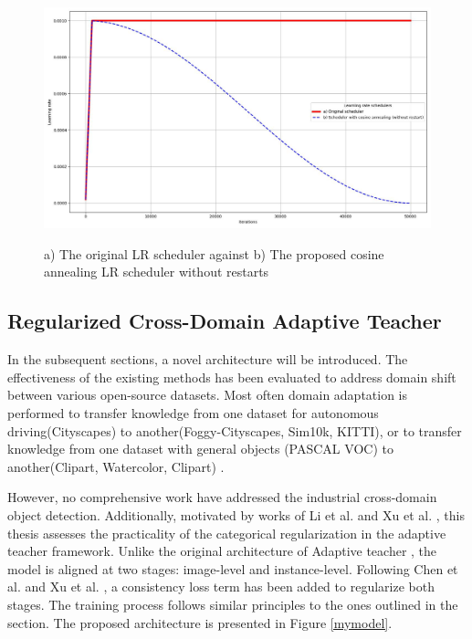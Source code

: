 \documentclass[english, 12pt, a4paper, elec, utf8, a-1b, online]{aaltothesis}
\begin{document}
\begin{figure}[htb]
	\begin{center}
		\includegraphics[width=14cm]{./LR.jpg}
	\end{center}
	\caption{a) The original LR scheduler against b) The proposed cosine annealing LR scheduler without restarts}
	\begin{center}
		\label{annealing}
	\end{center}
\end{figure}
\FloatBarrier

\subsection{Regularized Cross-Domain Adaptive Teacher}
\label{mainExperiments} 
In the subsequent sections, a novel architecture will be introduced. The effectiveness of the existing methods has been evaluated to address domain shift  between various open-source datasets. Most often domain adaptation is performed to transfer knowledge from one dataset for autonomous driving(Cityscapes) to another(Foggy-Cityscapes, Sim10k, KITTI), or to transfer knowledge from one dataset with general objects (PASCAL VOC) to another(Clipart, Watercolor, Clipart) \cite{Oza2021}.  

However, no comprehensive work have addressed the industrial cross-domain object detection. Additionally, motivated by works of Li et al. \cite{Li2021} and Xu et al. \cite{Xu2020}, this thesis assesses the practicality of the categorical regularization in the adaptive teacher framework. Unlike the original architecture of Adaptive teacher \cite{Li2021}, the model is aligned at two stages:  image-level and instance-level. Following Chen et al. \cite{Chen2018} and Xu et al. \cite{Xu2020}, a consistency loss term has been added to regularize both stages. The training process follows similar principles to the ones outlined in the  section. The proposed architecture is presented in Figure \ref{mymodel}. 
\end{document}
